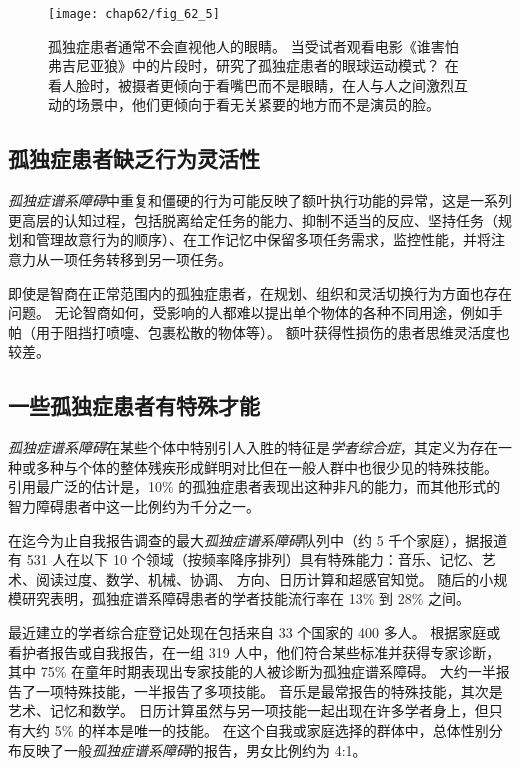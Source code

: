 \begin{figure}[htbp]
	\centering
	\texttt{[image: chap62/fig\_62\_5]}
	\caption{孤独症患者通常不会直视他人的眼睛。
		当受试者观看电影《谁害怕弗吉尼亚狼》中的片段时，研究了孤独症患者的眼球运动模式？
		在看人脸时，被摄者更倾向于看嘴巴而不是眼睛，在人与人之间激烈互动的场景中，他们更倾向于看无关紧要的地方而不是演员的脸\cite{klin2002defining}。}
	\label{fig:62_5}
\end{figure}



\subsection{孤独症患者缺乏行为灵活性}

\textit{孤独症谱系障碍}中重复和僵硬的行为可能反映了额叶执行功能的异常，这是一系列更高层的认知过程，包括脱离给定任务的能力、抑制不适当的反应、坚持任务（规划和管理故意行为的顺序）、在工作记忆中保留多项任务需求，监控性能，并将注意力从一项任务转移到另一项任务。


即使是智商在正常范围内的孤独症患者，在规划、组织和灵活切换行为方面也存在问题。
无论智商如何，受影响的人都难以提出单个物体的各种不同用途，例如手帕（用于阻挡打喷嚏、包裹松散的物体等）。
额叶获得性损伤的患者思维灵活度也较差。



\subsection{一些孤独症患者有特殊才能}

\textit{孤独症谱系障碍}在某些个体中特别引人入胜的特征是\textit{学者综合症}，其定义为存在一种或多种与个体的整体残疾形成鲜明对比但在一般人群中也很少见的特殊技能。
引用最广泛的估计是，10\% 的孤独症患者表现出这种非凡的能力，而其他形式的智力障碍患者中这一比例约为千分之一。


在迄今为止自我报告调查的最大\textit{孤独症谱系障碍}队列中（约 5 千个家庭），据报道有 531 人在以下 10 个领域（按频率降序排列）具有特殊能力：音乐、记忆、艺术、阅读过度、数学、机械、协调、 方向、日历计算和超感官知觉。
随后的小规模研究表明，孤独症谱系障碍患者的学者技能流行率在 13\% 到 28\% 之间。


最近建立的学者综合症登记处现在包括来自 33 个国家的 400 多人。
根据家庭或看护者报告或自我报告，在一组 319 人中，他们符合某些标准并获得专家诊断，其中 75\% 在童年时期表现出专家技能的人被诊断为孤独症谱系障碍。
大约一半报告了一项特殊技能，一半报告了多项技能。
音乐是最常报告的特殊技能，其次是艺术、记忆和数学。
日历计算虽然与另一项技能一起出现在许多学者身上，但只有大约 5\% 的样本是唯一的技能。
在这个自我或家庭选择的群体中，总体性别分布反映了一般\textit{孤独症谱系障碍}的报告，男女比例约为 4:1。


